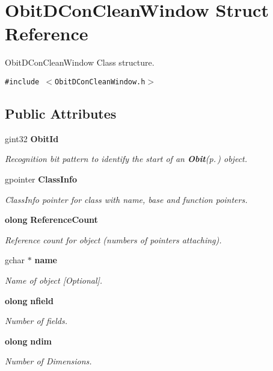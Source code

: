 \section{Obit\-DCon\-Clean\-Window Struct Reference}
\label{structObitDConCleanWindow}
Obit\-DCon\-Clean\-Window Class structure.  


{\tt \#include $<$Obit\-DCon\-Clean\-Window.h$>$}

\subsection*{Public Attributes}
\begin{CompactItemize}
\item 
gint32 {\bf Obit\-Id}
\begin{CompactList}\small\item\em Recognition bit pattern to identify the start of an {\bf Obit}{\rm (p.\,\pageref{structObit})} object. \item\end{CompactList}\item 
gpointer {\bf Class\-Info}
\begin{CompactList}\small\item\em Class\-Info pointer for class with name, base and function pointers. \item\end{CompactList}\item 
{\bf olong} {\bf Reference\-Count}
\begin{CompactList}\small\item\em Reference count for object (numbers of pointers attaching). \item\end{CompactList}\item 
gchar $\ast$ {\bf name}
\begin{CompactList}\small\item\em Name of object [Optional]. \item\end{CompactList}\item 
{\bf olong} {\bf nfield}
\begin{CompactList}\small\item\em Number of fields. \item\end{CompactList}\item 
{\bf olong} {\bf ndim}
\begin{CompactList}\small\item\em Number of Dimensions. \item\end{CompactList}\item 

\end{CompactItemize}
